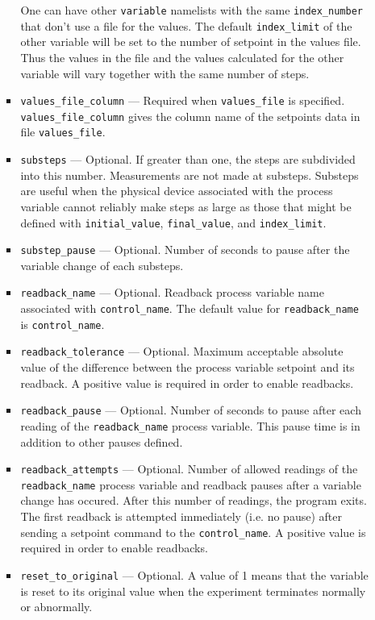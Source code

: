 \begin{itemize}
\begin{itemize}
\begin{itemize}
                One can have other \verb+variable+ namelists with the same \verb+index_number+
                that don't use a file for the values.
                The default {\verb+index_limit+} of the other variable will be
                set to the number of setpoint in the values file.
                Thus the values in the file and the values calculated for the other variable 
                will vary together with the same number of steps.
        \item {\verb+values_file_column+} --- Required when {\verb+values_file+} is specified.
                {\verb+values_file_column+} gives the column name of the setpoints data 
                in file {\verb+values_file+}. 
        \item {\verb+substeps+} --- Optional. If greater than one, the steps are subdivided into this number.
                Measurements are not made at substeps. Substeps are useful
                when the physical device associated with the process variable cannot reliably make 
                steps as large as those that might be defined with {\verb+initial_value+},
                {\verb+final_value+}, and {\verb+index_limit+}.
        \item {\verb+substep_pause+} --- Optional. Number of seconds to pause after the variable change of each substeps.
        \item {\verb+readback_name+} --- Optional. Readback process variable name 
                associated with {\verb+control_name+}. 
                The default value for {\verb+readback_name+} is {\verb+control_name+}.
        \item {\verb+readback_tolerance+} --- Optional. Maximum acceptable
                absolute value of the difference between the process variable
                setpoint and its readback. A positive value is required in order to enable readbacks.
        \item {\verb+readback_pause+} --- Optional. Number of seconds to pause after 
                each reading of the {\verb+readback_name+} process variable. 
                This pause time is in addition to other pauses defined.
        \item {\verb+readback_attempts+} --- Optional. Number of allowed readings 
                of the {\verb+readback_name+} process variable
                and readback pauses after a variable change has occured. 
                After this number of readings, the program exits.
                The first readback is attempted immediately (i.e. no pause) after 
                sending a setpoint command to the {\verb+control_name+}.
                A positive value is required in order to enable readbacks.
        \item {\verb+reset_to_original+} --- Optional. A value of 1 means 
                that the variable is reset to its original value when the 
                experiment terminates normally or abnormally. 
\end{itemize}


\end{itemize}
\end{itemize}
